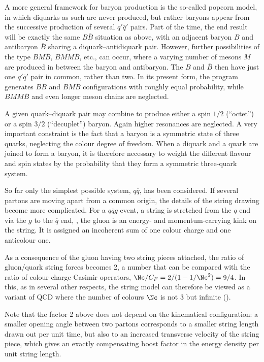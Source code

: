 A more general framework for baryon production is the so-called
popcorn model, in which diquarks as such are never produced, but
rather baryons appear from the successive production of several 
$q'\overline{q}'$ pairs. Part of the time, the end result will be 
exactly the same $B\overline{B}$ situation as above, \ie with an 
adjacent baryon $B$ and antibaryon $\overline{B}$ sharing a 
diquark--antidiquark pair. However, further possibilities of the type 
$BM\overline{B}$, $BMM\overline{B}$, etc., can occur,
where a varying number of mesons $M$ are produced in between 
the baryon and antibaryon. The $B$ and $\overline{B}$ then have just 
one $q'\overline{q}'$ pair in common, rather than two. In its present 
form, the program generates $B\overline{B}$ and $BM\overline{B}$ 
configurations with roughly equal probability, while $BMM\overline{B}$ 
and even longer meson chains are neglected.

A given quark--diquark pair may combine to produce either a spin $1/2$
(``octet'') or a spin $3/2$ (``decuplet'') baryon. Again higher resonances 
are neglected. A very important constraint is the fact that a baryon is 
a symmetric state of three quarks, neglecting the colour degree of 
freedom. When a diquark and a quark are joined to form a baryon, it is 
therefore necessary to weight the different flavour and spin states 
by the probability that they form a symmetric three-quark system.

So far only the simplest possible system, $q\overline{q}$, has been
considered. If several partons are moving apart from a common origin, 
the details of the string drawing become more complicated. For a 
$q\overline{q}g$ event, a string is stretched from the $q$ end 
via the $g$ to the $\overline{q}$ end, , 
\ie the gluon is an energy- and momentum-carrying kink on the string. 
It is assigned an incoherent sum of one colour charge and one anticolour 
one. 

As a consequence of the gluon having two string pieces attached, the
ratio of gluon/quark string forces becomes 2, a number that can be
compared with the ratio of colour charge Casimir operators, $\Nc/C_F =
2/(1-1/\Nc^2) = 9/4$. In this, as in several other respects, the
string model can therefore be viewed as a variant of QCD where the
number of colours $\Nc$ is not 3 but infinite (\cf{}).

Note that the factor 2 above does not depend on the kinematical 
configuration: a smaller opening angle between two partons corresponds 
to a smaller string length drawn out per unit time, but also to an 
increased transverse velocity of the string piece, which gives an 
exactly compensating boost factor in the energy density per unit 
string length. 

